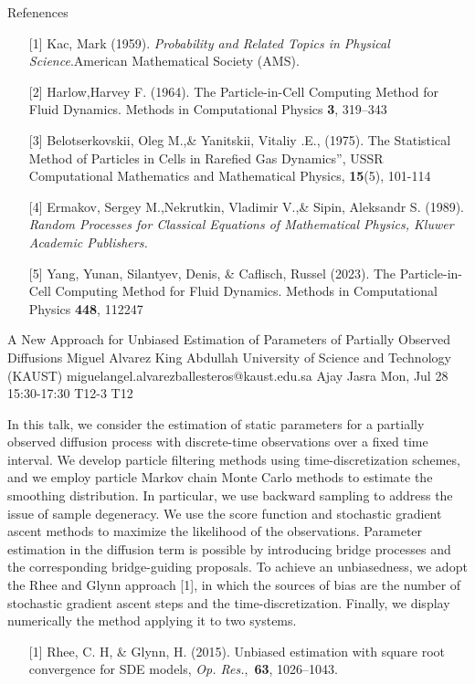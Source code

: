 \begin{talk}
Refenences
\begin{enumerate}
	\item[{[1]}] Kac, Mark (1959). {\it Probability and Related Topics in Physical Science}.American Mathematical Society (AMS).
	\item[{[2]}] Harlow,Harvey F.  (1964).   The Particle-in-Cell Computing Method for Fluid Dynamics. Methods in Computational Physics \textbf{3}, 319--343
\item[{[3]}] Belotserkovskii, Oleg M.,\& Yanitskii, Vitaliy .E.,   (1975).  The Statistical Method of Particles in Cells in Rarefied Gas Dynamics”, USSR Computational Mathematics and Mathematical Physics,  \textbf{15}(5), 101-114
\item[{[4]}] Ermakov, Sergey M.,Nekrutkin, Vladimir V.,\& Sipin, Aleksandr S.  (1989). {\it Random Processes for Classical Equations of Mathematical Physics, Kluwer Academic Publishers.}
\item[{[5]} ] Yang, Yunan, Silantyev, Denis, \&   Caflisch, Russel (2023).   The Particle-in-Cell Computing Method for Fluid Dynamics. Methods in Computational Physics \textbf{448}, 112247
\end{enumerate}

\end{talk}

\begin{talk}
  {A New Approach for Unbiased Estimation of Parameters of Partially Observed Diffusions}%
  {Miguel Alvarez}%
  {King Abdullah University of Science and Technology (KAUST)}%
  {miguelangel.alvarezballesteros@kaust.edu.sa}%
  {Ajay Jasra}%
  {}%
  {Mon, Jul 28 15:30-17:30}%
  {T12-3}%
  {T12}%
  
				
			
In this talk, we consider the estimation of static parameters for a partially observed diffusion process with discrete-time observations over a fixed time interval. We develop particle filtering methods using time-discretization schemes, and we employ particle Markov chain Monte Carlo methods to estimate the smoothing distribution. In particular, we use backward sampling to address the issue of sample degeneracy. We use the score function and stochastic gradient ascent methods to maximize the likelihood of the observations. Parameter estimation in the diffusion term is possible by introducing bridge processes and the corresponding bridge-guiding proposals. To achieve an unbiasedness, we adopt the Rhee and Glynn approach [1], in which the sources of bias are the number of stochastic gradient ascent steps and the time-discretization. Finally, we display numerically the method applying it to two systems. 

\medskip

\begin{enumerate}
	\item[{[1]}] Rhee, C. H, \& Glynn, H. (2015).  Unbiased estimation with square root convergence for SDE models, \emph{Op. Res.},~{\bf 63}, 1026--1043. 
\end{enumerate}

\end{talk}

